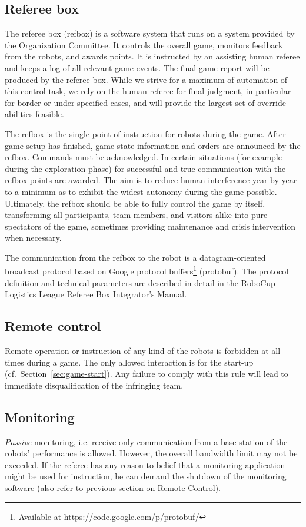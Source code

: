 \documentclass[12pt,twoside]{article}
\newcommand{\refsec}[1]{Section~\ref{#1}}
\begin{document}
\subsection{Referee box}
\label{sec:referee-box}
The referee box (refbox) is a software system that runs on a system
provided by the Organization Committee. It controls the overall game,
monitors feedback from the robots, and awards points. It is instructed
by an assisting human referee and keeps a log of all relevant game
events. The final game report will be produced by the referee
box. While we strive for a maximum of automation of this control task,
we rely on the human referee for final judgment, in particular for
border or under-specified cases, and will provide the largest set of
override abilities feasible.

The refbox is the single point of instruction for robots during the
game. After game setup has finished, game state information and orders
are announced by the refbox. Commands must be acknowledged. In certain
situations (for example during the exploration phase) for successful
and true communication with the refbox points are awarded. The aim is
to reduce human interference year by year to a minimum as to exhibit
the widest autonomy during the game possible. Ultimately, the refbox
should be able to fully control the game by itself, transforming all
participants, team members, and visitors alike into pure spectators of
the game, sometimes providing maintenance and crisis intervention when
necessary.

The communication from the refbox to the robot is a datagram-oriented
broadcast protocol based on Google protocol buffers\footnote{Available
  at \url{https://code.google.com/p/protobuf/}} (protobuf). The
protocol definition and technical parameters are described in detail
in the RoboCup Logistics League Referee Box Integrator's Manual.

\subsection{Remote control}
\label{sec:remote-control}
Remote operation or instruction of any kind of the robots is forbidden
at all times during a game. The only allowed interaction is for the start-up
(cf.~\refsec{sec:game-start}). Any failure to comply with this rule will lead to
immediate disqualification of the infringing team.

\subsection{Monitoring}
\label{sec:monitoring}
\emph{Passive} monitoring, i.e. receive-only communication from a base
station of the robots' performance is allowed. However, the overall
bandwidth limit may not be exceeded.
If the referee has any reason to belief that a monitoring application
might be used for instruction, he can demand the shutdown of the
monitoring software (also refer to previous section on Remote
Control).
\end{document}
